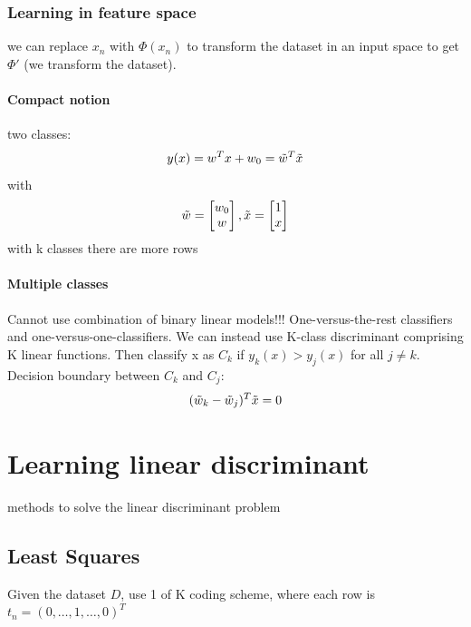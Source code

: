 \subsubsection{Learning in feature space}
we can replace $x_{n}$ with $\Phi(x_{n})$ to transform the dataset in an input space to get $\Phi'$ (we transform the dataset).

\paragraph{Compact notion}
two classes:
\begin{equation}
    y(x) = w^{T}x + w_{0} = \Tilde{w}^{T}\Tilde{x}
\end{equation}
with
\begin{equation}
    \Tilde{w} = \begin{bmatrix} 
                    w_{0} \\
                    w
                \end{bmatrix},
    \Tilde{x} = \begin{bmatrix} 
                    1 \\
                    x
                \end{bmatrix}
\end{equation}
with k classes there are more rows

\paragraph{Multiple classes}
Cannot use combination of binary linear models!!!
One-versus-the-rest classifiers and one-versus-one-classifiers. We can instead use K-class discriminant comprising K linear functions. Then classify x as $C_{k}$ if $y_{k}(x) > y_{j}(x)$ for all $j \neq k$. Decision boundary between $C_{k}$ and $C_{j}$:
\begin{equation}
    (\Tilde{w}_{k} - \Tilde{w}_{j})^{T}\Tilde{x} = 0
\end{equation}

\section{Learning linear discriminant}
methods to solve the linear discriminant problem
\subsection{Least Squares}
Given the dataset $D$, use 1 of K coding scheme, where each row is $t_{n} = (0, \dots, 1, \dots, 0)^{T}$

